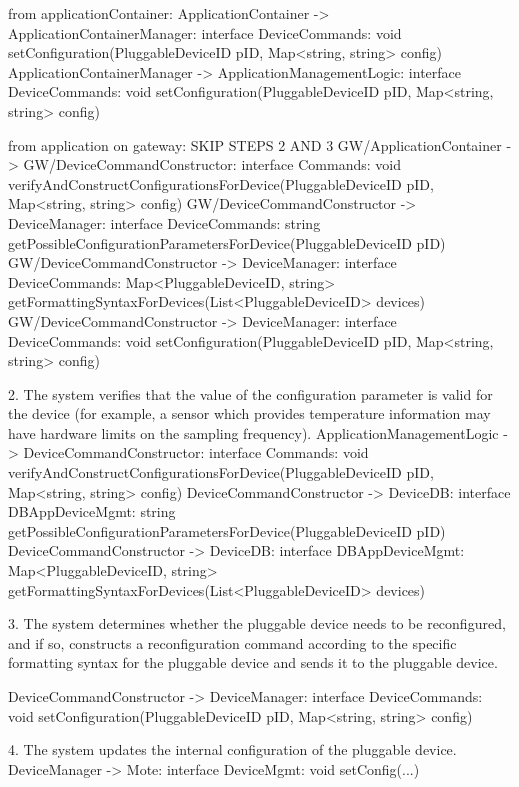                 from applicationContainer:
                    ApplicationContainer -> ApplicationContainerManager: interface DeviceCommands: void setConfiguration(PluggableDeviceID pID, Map<string, string> config)
                    ApplicationContainerManager -> ApplicationManagementLogic: interface DeviceCommands: void setConfiguration(PluggableDeviceID pID, Map<string, string> config)

                from application on gateway: SKIP STEPS 2 AND 3
                    GW/ApplicationContainer -> GW/DeviceCommandConstructor: interface Commands: void verifyAndConstructConfigurationsForDevice(PluggableDeviceID pID, Map<string, string> config)
                    GW/DeviceCommandConstructor -> DeviceManager: interface DeviceCommands: string getPossibleConfigurationParametersForDevice(PluggableDeviceID pID)
                    GW/DeviceCommandConstructor -> DeviceManager: interface DeviceCommands: Map<PluggableDeviceID, string> getFormattingSyntaxForDevices(List<PluggableDeviceID> devices)
                    GW/DeviceCommandConstructor -> DeviceManager: interface DeviceCommands: void setConfiguration(PluggableDeviceID pID, Map<string, string> config)

            2. The system verifies that the value of the configuration parameter is valid for the device (for example, a sensor which provides temperature information may have hardware limits on the sampling frequency).
                    ApplicationManagementLogic -> DeviceCommandConstructor: interface Commands: void verifyAndConstructConfigurationsForDevice(PluggableDeviceID pID, Map<string, string> config)
                    DeviceCommandConstructor -> DeviceDB: interface DBAppDeviceMgmt: string getPossibleConfigurationParametersForDevice(PluggableDeviceID pID)
                    DeviceCommandConstructor -> DeviceDB: interface DBAppDeviceMgmt: Map<PluggableDeviceID, string> getFormattingSyntaxForDevices(List<PluggableDeviceID> devices)

            3. The system determines whether the pluggable device needs to be reconfigured, and if so,
               constructs a reconfiguration command according to the specific formatting syntax for the pluggable device and sends it to the pluggable device.

                    DeviceCommandConstructor -> DeviceManager: interface DeviceCommands: void setConfiguration(PluggableDeviceID pID, Map<string, string> config)

            4. The system updates the internal configuration of the pluggable device.
                    DeviceManager -> Mote: interface DeviceMgmt: void setConfig(...)

